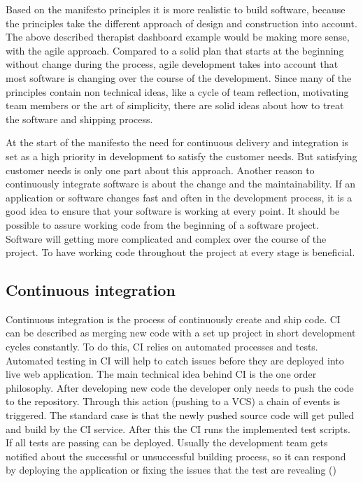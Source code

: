 Based on the manifesto principles it is more realistic to build software, because the principles take the different approach of design and construction into
account. The above described therapist dashboard example would be making more sense, with the agile approach. Compared to a solid plan that starts at the beginning
without change during the process, agile development takes into account that most software is changing over the course of the
development. Since many of the principles contain non technical ideas, like a cycle of team reflection, motivating team members or the art of simplicity,
there are solid ideas about how to treat the software and shipping process.

At the start of the manifesto the need for continuous delivery and integration is set as a high priority in development to satisfy the customer needs.
But satisfying customer needs is only one part about this approach. Another reason to continuously integrate software is about the change and the maintainability.
If an application or software changes fast and often in the development process, it is a good idea to ensure that your software is working at every point.
It should be possible to assure working code from the beginning of a software project. Software will getting more complicated and complex over the course of the
project. To have working code throughout the project at every stage is beneficial.


\subsection{Continuous integration}
Continuous integration is the process of continuously create and ship code. CI can be described as merging new code with a set up project in short
development cycles constantly. To do this, CI relies on automated processes and tests. Automated testing in CI will help to catch issues before they
are deployed into live web application. The main technical idea behind CI is
the one order philosophy. After developing new code the developer only needs to push the code to the repository. Through this action (pushing to a VCS) a chain
of events is triggered. The standard case is that the newly pushed source code will get pulled and build by the CI service. After this the CI runs the implemented
test scripts. If all tests are passing can be deployed. Usually the development team gets notified about the successful or unsuccessful building process, so
it can respond by deploying the application or fixing the issues that the test are revealing (\cite{stolberg2009enabling})

